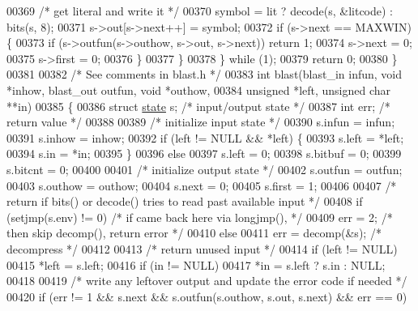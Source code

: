 \begin{DoxyCode}
00369             \textcolor{comment}{/* get literal and write it */}
00370             symbol = lit ? decode(s, &litcode) : bits(s, 8);
00371             s->out[s->next++] = symbol;
00372             \textcolor{keywordflow}{if} (s->next == MAXWIN) \{
00373                 \textcolor{keywordflow}{if} (s->outfun(s->outhow, s->out, s->next)) \textcolor{keywordflow}{return} 1;
00374                 s->next = 0;
00375                 s->first = 0;
00376             \}
00377         \}
00378     \} \textcolor{keywordflow}{while} (1);
00379     \textcolor{keywordflow}{return} 0;
00380 \}
00381 
00382 \textcolor{comment}{/* See comments in blast.h */}
00383 \textcolor{keywordtype}{int} blast(blast\_in infun, \textcolor{keywordtype}{void} *inhow, blast\_out outfun, \textcolor{keywordtype}{void} *outhow,
00384           \textcolor{keywordtype}{unsigned} *left, \textcolor{keywordtype}{unsigned} \textcolor{keywordtype}{char} **in)
00385 \{
00386     \textcolor{keyword}{struct }\hyperlink{structstate}{state} s;             \textcolor{comment}{/* input/output state */}
00387     \textcolor{keywordtype}{int} err;                    \textcolor{comment}{/* return value */}
00388 
00389     \textcolor{comment}{/* initialize input state */}
00390     s.infun = infun;
00391     s.inhow = inhow;
00392     \textcolor{keywordflow}{if} (left != NULL && *left) \{
00393         s.left = *left;
00394         s.in = *in;
00395     \}
00396     \textcolor{keywordflow}{else}
00397         s.left = 0;
00398     s.bitbuf = 0;
00399     s.bitcnt = 0;
00400 
00401     \textcolor{comment}{/* initialize output state */}
00402     s.outfun = outfun;
00403     s.outhow = outhow;
00404     s.next = 0;
00405     s.first = 1;
00406 
00407     \textcolor{comment}{/* return if bits() or decode() tries to read past available input */}
00408     \textcolor{keywordflow}{if} (setjmp(s.env) != 0)             \textcolor{comment}{/* if came back here via longjmp(), */}
00409         err = 2;                        \textcolor{comment}{/*  then skip decomp(), return error */}
00410     \textcolor{keywordflow}{else}
00411         err = decomp(&s);               \textcolor{comment}{/* decompress */}
00412 
00413     \textcolor{comment}{/* return unused input */}
00414     \textcolor{keywordflow}{if} (left != NULL)
00415         *left = s.left;
00416     \textcolor{keywordflow}{if} (in != NULL)
00417         *in = s.left ? s.in : NULL;
00418 
00419     \textcolor{comment}{/* write any leftover output and update the error code if needed */}
00420     \textcolor{keywordflow}{if} (err != 1 && s.next && s.outfun(s.outhow, s.out, s.next) && err == 0)

\end{DoxyCode}
